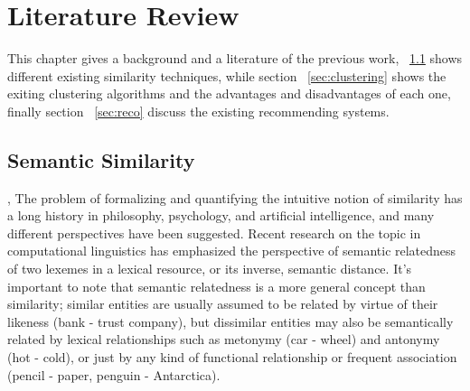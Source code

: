 
\chapter{Literature Review} %

\label{literature} %


This chapter gives a background and a literature of the previous work, ~\ref{sec:sim} shows different existing similarity techniques, while section ~\ref{sec:clustering}  shows the exiting clustering algorithms and the advantages and disadvantages of each one, finally section ~\ref{sec:reco} discuss the existing recommending systems.
\section{Semantic Similarity}\label{sec:sim}, 
The problem of formalizing and quantifying the intuitive notion of similarity has a long history in philosophy, psychology, and artificial intelligence, and many different perspectives have been suggested. Recent research on the topic in computational linguistics has emphasized the perspective of semantic relatedness of two lexemes in a lexical resource, or its inverse, semantic distance. It’s important to note that semantic relatedness is a more general concept than similarity; similar entities are usually assumed to be related by virtue of their likeness (bank - trust company), but dissimilar entities may also be semantically related by lexical relationships such as metonymy (car - wheel) and antonymy (hot - cold), or just by any kind of functional relationship or frequent association (pencil - paper, penguin - Antarctica).\\

